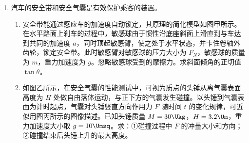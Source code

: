 \documentclass[\gkver]{gaokaozhenti}
\begin{document}
\begin{enumerate}
{由于 $p_{0}-p_{B2}<\Delta p$

假设成立，即 $p_{B2}=9 \times 10^{4} \UPa$

（3）恰好稳定时，A 内气体压强为 $p_{A}'=p_{0}+\frac{mg}{S}$

B 内气体压强 $p_{B}'=p_{0}$

此时差压阀恰好关闭，所以有 $p_{A}'-p_{B}'=\Delta p$

代入数据联立解得 $m = 1.1 \times 10^{2} \Ukg$。
}

\item
汽车的安全带和安全气囊是有效保护乘客的装置。
\begin{enumerate}
	\item
	安全带能通过感应车的加速度自动锁定，其原理的简化模型如图甲所示。在水平路面上刹车的过程中，敏感球由于惯性沿底座斜面上滑直到与车达到共同的加速度 $a$，同时顶起敏感臂，使之处于水平状态，并卡住卷轴外齿轮，锁定安全带。此时敏感臂对敏感球的压力大小为 $F_{N}$，敏感球的质量为 $m$，重力加速度为 $g$。忽略敏感球受到的摩擦力。求斜面倾角的正切值 $\tan\theta$。
	\item
	如图乙所示，在安全气囊的性能测试中，可视为质点的头锤从离气囊表面高度为 $H$ 处做自由落体运动，与正下方的气囊发生碰撞。以头锤到气囊表面为计时起点，气囊对头锤竖直方向作用力 $F$ 随时间 $t$ 的变化规律，可近似用图丙所示的图像描述。已知头锤质量 $M = 30 \Ukg$，$H = 3.2 \Um$，重力加速度大小取 $g = 10 \Umsq$。求：①碰撞过程中 $F$ 的冲量大小和方向；②碰撞结束后头锤上升的最大高度。
\end{enumerate}

\end{enumerate}
\end{document}
